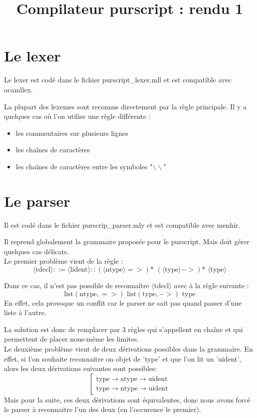 \documentclass[12pt,a4paper,french]{article}
\title{Compilateur purscript : rendu 1}
\begin{document}
\maketitle

\part*{Le lexer}
Le lexer est codé dans le fichier purscript\_lexer.mll et est compatible avec ocamllex.

La plupart des lexemes sont reconnus directement par la règle principale. Il y a quelques cas où l'on utilise une règle différente :

\begin{itemize}
\item les commentaires sur plusieurs lignes
\item les chaînes de caractères
\item les chaînes de caractères entre les symboles "$\backslash\backslash$"
\end{itemize}


\part*{Le parser}
Il est codé dans le fichier purscrip\_parser.mly et est compatible avec menhir.

Il reprend globalement la grammaire proposée pour le purscript. Mais doit gérer quelques cas délicats. \\

Le premier problème vient de la règle :
\[ \langle\text{tdecl}\rangle ::= \langle \text{lident}\rangle :: (\langle\text{ntype}\rangle =>)\text{* } (\langle\text{type}\rangle ->)\text{* } \langle\text{type}\rangle \]

Dans ce cas, il n'est pas possible de reconnaître $\langle\text{tdecl}\rangle$ avec à la règle suivante :
\[  \text{list}(\text{ntype}, =>) \text{ list}(\text{type}, ->) \text{ type} \]
En effet, cela provoque un conflit car le parser ne sait pas quand passer d'une liste à l'autre.

La solution est donc de remplacer par 3 règles qui s'appellent en chaîne et qui permettent de placer nous-même les limites.
\\
Le deuxième problème vient de deux dérivations possibles dans la grammaire. En effet, si l'on souhaite reconnaitre on objet de 'type' et que l'on lit un 'uident', alors les deux dérivations suivantes sont possibles:
\[ \left[ \begin{array}{l}
	\text{type} \rightarrow \text{atype} \rightarrow \text{uident} \\
	\text{type} \rightarrow \text{ntype} \rightarrow \text{uident}
\end{array} \right.
\]
Mais pour la suite, ces deux dérivations sont équivalentes, donc nous avons forcé le parser à reconnaitre l'un des deux (en l'occurence le premier).
\end{document}
